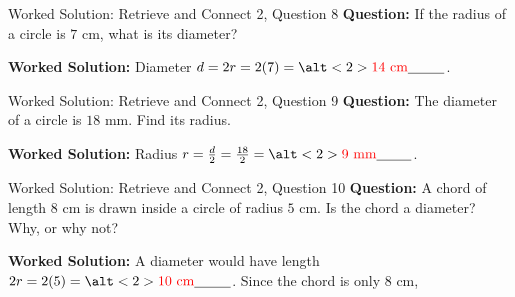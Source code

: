 \documentclass{beamer}
\newcommand{\ablank}[1]{%
  \alt<2>{\textcolor{red}{#1}}{\underline{\phantom{#1}}}%
}
\newcommand{\ashow}[1]{\uncover<2->{\textcolor{red}{\small #1}}}
\begin{document}
\begin{frame}{Worked Solution: Retrieve and Connect 2, Question 8}
\small
\textbf{Question:} If the radius of a circle is \(7\) cm, what is its diameter?

\textbf{Worked Solution:} Diameter \(d=2r=2(7)=\ablank{14\text{ cm}}\).
\end{frame}

\begin{frame}{Worked Solution: Retrieve and Connect 2, Question 9}
\small
\textbf{Question:} The diameter of a circle is \(18\) mm. Find its radius.

\textbf{Worked Solution:} Radius \(r=\frac{d}{2}=\frac{18}{2}=\ablank{9\text{ mm}}\).
\end{frame}

\begin{frame}{Worked Solution: Retrieve and Connect 2, Question 10}
\small
\textbf{Question:} A chord of length \(8\) cm is drawn inside a circle of radius \(5\) cm. Is the chord a diameter? Why, or why not?

\textbf{Worked Solution:} A diameter would have length \(2r=2(5)=\ablank{10\text{ cm}}\). Since the chord is only \(8\) cm, \ashow{it is not a diameter; a diameter would be \(10\) cm.}
\end{frame}
\end{document}
